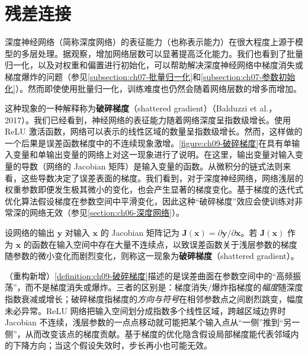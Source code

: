 \documentclass[../../main.tex]{subfiles}
\begin{document}
\section{残差连接}\label{section:ch09-残差连接}

深度神经网络（简称深度网络）的表征能力（也称表示能力）在很大程度上源于模型的多层处理。据观察，增加网络层数可以显著提高泛化能力。我们也看到了批量归一化，以及对权重和偏置进行初始化，可以帮助解决深度神经网络中梯度消失或梯度爆炸的问题（参见\cref{subsection:ch07-批量归一化}和\cref{subsection:ch07-参数初始化}）。然而即使使用批量归一化，训练难度也仍然会随着网络层数的增多而增加。

这种现象的一种解释称为\textbf{破碎梯度}（shattered gradient）（Balduzzi et al.，2017）。我们已经看到，神经网络的表征能力随着网络深度呈指数级增长。使用 ReLU 激活函数，网络可以表示的线性区域的数量呈指数级增长。然而，这样做的一个后果是误差函数梯度中的不连续现象激增。\cref{figure:ch09-破碎梯度}在具有单输入变量和单输出变量的网络上对这一现象进行了说明。在这里，输出变量对输入变量的导数（网络的 Jacobian 矩阵）是输入变量的函数。从微积分的链式法则来看，这些导数决定了误差表面的梯度。我们看到，对于深度神经网络，网络浅层的权重参数即便发生极其微小的变化，也会产生显著的梯度变化。基于梯度的迭代式优化算法假设梯度在参数空间中平滑变化，因此这种“破碎梯度”效应会使训练对非常深的网络无效（参见\cref{section:ch06-深度网络}）。

\begin{definition}[破碎梯度]\label{definition:ch09-破碎梯度}
设网络的输出 $\boldsymbol{y}$ 对输入 $\boldsymbol{x}$ 的 Jacobian 矩阵记为 $\boldsymbol{J}(\boldsymbol{x})=\partial\boldsymbol{y}/\partial\boldsymbol{x}$。若 $\boldsymbol{J}(\boldsymbol{x})$ 作为 $\boldsymbol{x}$ 的函数在输入空间中存在大量不连续点，以致误差函数关于浅层参数的梯度随参数的微小变化而剧烈变化，则称这一现象为\textbf{破碎梯度}（shattered gradient）。
\end{definition}

\begin{remark}（重构新增）\cref{definition:ch09-破碎梯度}描述的是误差曲面在参数空间中的“高频振荡”，而不是梯度消失或爆炸。三者的区别是：梯度消失/爆炸指梯度的\emph{幅度}随深度指数衰减或增长；破碎梯度指梯度的\emph{方向与符号}在相邻参数点之间剧烈跳变，幅度未必异常。ReLU 网络把输入空间划分成指数多个线性区域，跨越区域边界时 Jacobian 不连续，浅层参数的一点点移动就可能把某个输入点从“一侧”推到“另一侧”，从而改变该点的梯度贡献。基于梯度的优化隐含假设局部梯度能代表邻域内的下降方向；当这个假设失效时，步长再小也可能无效。
\end{remark}
\end{document}
